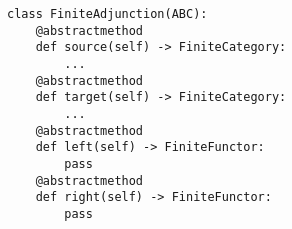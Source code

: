 \par\begin{minipage}{60ex}
\begin{verbatim}
class FiniteAdjunction(ABC):
    @abstractmethod
    def source(self) -> FiniteCategory:
        ...
    @abstractmethod
    def target(self) -> FiniteCategory:
        ...
    @abstractmethod
    def left(self) -> FiniteFunctor:
        pass
    @abstractmethod
    def right(self) -> FiniteFunctor:
        pass
\end{verbatim}
\end{minipage}\par
